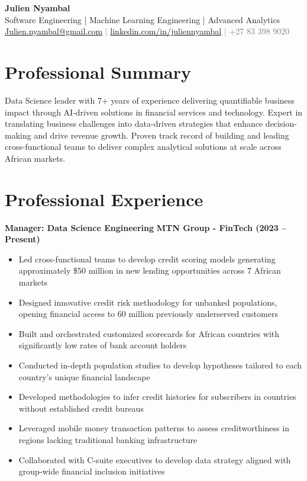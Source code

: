 \documentclass[a4paper,10pt]{article}
\begin{document}
\pagestyle{empty}

\begin{center}
    {\Huge \textbf{Julien Nyambal}}\\
    {\large Software Engineering | Machine Learning Engineering | Advanced Analytics}\\
    \vspace{0.5em}
    {\small \textcolor{gray}{\href{mailto:Julien.nyambal@gmail.com}{Julien.nyambal@gmail.com} | \href{https://linkedin.com/in/juliennyambal}{linkedin.com/in/juliennyambal} | +27 83 398 9020}}
\end{center}

\section{Professional Summary}
Data Science leader with 7+ years of experience delivering quantifiable business impact through AI-driven solutions in financial services and technology. Expert in translating business challenges into data-driven strategies that enhance decision-making and drive revenue growth. Proven track record of building and leading cross-functional teams to deliver complex analytical solutions at scale across African markets.

\section{Professional Experience}
\textbf{Manager: Data Science Engineering} \hfill \textbf{MTN Group - FinTech (2023 – Present)}
\begin{itemize}[noitemsep,topsep=0pt]
    \item Led cross-functional teams to develop credit scoring models generating approximately \$50 million in new lending opportunities across 7 African markets
    \item Designed innovative credit risk methodology for unbanked populations, opening financial access to 60 million previously underserved customers
    \item Built and orchestrated customized scorecards for African countries with significantly low rates of bank account holders
    \item Conducted in-depth population studies to develop hypotheses tailored to each country's unique financial landscape
    \item Developed methodologies to infer credit histories for subscribers in countries without established credit bureaus
    \item Leveraged mobile money transaction patterns to assess creditworthiness in regions lacking traditional banking infrastructure
    \item Collaborated with C-suite executives to develop data strategy aligned with group-wide financial inclusion initiatives
\end{itemize}
\end{document}
